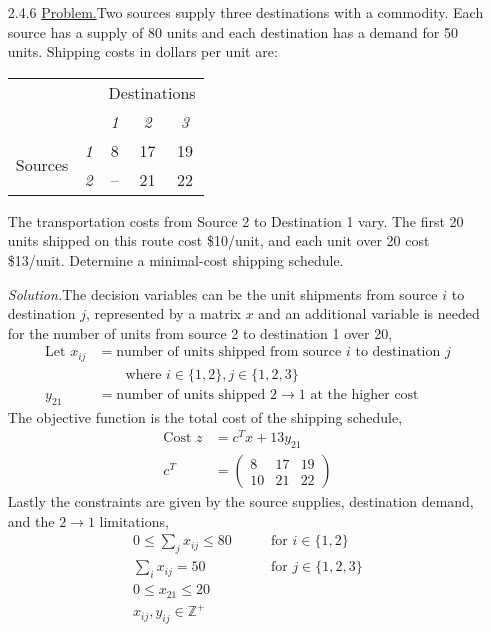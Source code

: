 \documentclass{homework}
\begin{document}
\begin{enumerate}
		\item[2.4.6] \underline{Problem.}\quad Two sources supply three destinations with a commodity. Each source has a supply of 80 units and each destination has a demand for 50 units. Shipping costs in dollars per unit are:
		
		\begin{center}
			\begin{tabular}{lcccc}
				\toprule
				& & \multicolumn{3}{c}{Destinations} \\
				& & \textit{1} & \textit2 & \textit3 \\
				\midrule
				\multirow{2}{*}{Sources} & \textit1 & 8 & 17 & 19 \\
				& \textit2 & -- & 21 & 22 \\
				\bottomrule
			\end{tabular}
		\end{center}
		The transportation costs from Source 2 to Destination 1 vary. The first 20 units shipped on this route cost \$10/unit, and each unit over 20 cost \$13/unit. Determine a minimal-cost shipping schedule.
		
		\textit{Solution.}\quad The decision variables can be the unit shipments from source $i$ to destination $j$, represented by a matrix $x$ and an additional variable is needed for the number of units from source 2 to destination 1 over 20, \begin{align*}
			\text{Let } x_{ij} & = \text{number of units shipped from source $i$ to destination $j$} \\
			& \qquad \text{where } i \in \{ 1, 2\}, j \in \{ 1, 2, 3 \} \\
			y_{21} & = \text{number of units shipped $2 \to 1$ at the higher cost}
		\end{align*}
		The objective function is the total cost of the shipping schedule, \begin{align*}
			\text{Cost } z & = c^T x + 13 y_{21}\\
			c^T & = \begin{pmatrix}
				8 & 17 & 19 \\
				10 & 21 & 22
			\end{pmatrix}
		\end{align*}
		Lastly the constraints are given by the source supplies, destination demand, and the $2 \to 1$ limitations, \begin{align*}
			0 \le \sum_j x_{ij} \le 80 & \qquad \text{for } i \in \{ 1, 2\} \\
			 \sum_i x_{ij} = 50 & \qquad \text{for } j \in \{1, 2, 3\} \\
			 0 \le x_{21} \le 20 \\
			 x_{ij}, y_{ij} \in \mathbb{Z}^+
		\end{align*}
	

\end{enumerate}
\end{document}
